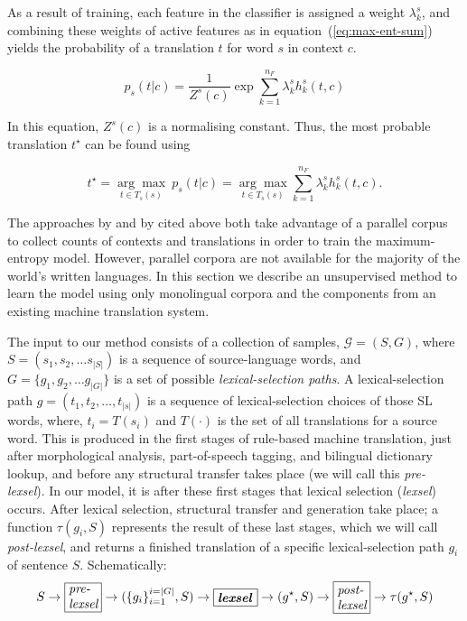\documentclass[11pt]{article}
\begin{document}
As a result of training, each feature in the classifier is assigned a
weight $\lambda_k^s$, and combining these weights of active features
as in equation~(\ref{eq:max-ent-sum}) yields the probability of a
translation $t$ for word $s$ in context $c$.

\begin{equation}
p_s(t|c) = \frac{1}{Z^s(c)} \exp{ \sum_{k=1}^{n_F} \lambda_k^s h_k^s(t, c)}
\label{eq:max-ent-sum}
\end{equation}

In this equation, $Z^s(c)$ is a normalising constant. Thus, the most
probable translation \(t^\star\) can be found using

\begin{equation}
  t^\star=\underset{t \in T_s(s)}{\arg\max} ~ p_s(t|c) = \underset{t \in T_s(s)}{\arg\max} \sum_{k=1}^{n_F} \lambda_k^s h_k^s(t, c) .
\label{eq:max-ent-max}
\end{equation}


The approaches by \cite{berger1996} and by \cite{marechek10} cited
above both take advantage of a parallel corpus to collect counts of
contexts and translations in order to train the maximum-entropy
model. However, parallel corpora are not available for the majority of
the world's written languages. In this section we describe an
unsupervised method to learn the model using only monolingual corpora
and the components from an existing machine translation system.

The input to our method consists of a collection of samples,
$\mathcal{G} = (S, G)$, where $S = (s_1, s_2, \ldots s_{|S|})$ is a
sequence of source-language words, and $G = \{g_1, g_2, \ldots
g_{|G|}\}$ is a set of possible \emph{lexical-selection paths}. A
lexical-selection path $g = (t_1, t_2, \ldots, t_{|s|})$ is a sequence
of lexical-selection choices of those SL words, where, \(t_i=T(s_i)\)
and \(T(\cdot)\) is the set of all translations for a source
word. This is produced in the first stages of rule-based machine
translation, just after morphological analysis, part-of-speech
tagging, and bilingual dictionary lookup, and before any structural
transfer takes place (we will call this \emph{pre-lexsel}). In our
model, it is after these first stages that lexical selection
(\emph{lexsel}) occurs. After lexical selection, structural transfer
and generation take place; a function $\tau(g_i,S)$ represents the
result of these last stages, which we will call \emph{post-lexsel},
and returns a finished translation of a specific lexical-selection
path $g_i$ of sentence $S$. Schematically:
\begin{displaymath}
  \label{eq:steps}
  S \to \mbox{\framebox{\parbox{0.8cm}{\textit{pre- lexsel}}}} \to (\{g_i\}_{i=1}^{i=|G|},S) \to \mbox{\framebox{\parbox{1.0cm}{\textit{\textbf{lexsel}}}}} \to (g^\star,S) \to \mbox{\framebox{\parbox{0.8cm}{\textit{post- lexsel}}}} \to \tau(g^\star,S)
\end{displaymath}
\end{document}

